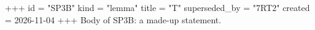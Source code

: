 +++
id = "SP3B"
kind = "lemma"
title = "T"
superseded_by = "7RT2"
created = 2026-11-04
+++
Body of SP3B: a made-up statement.
